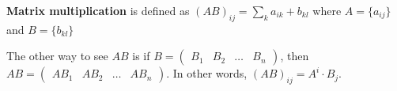 \begin{definition}
	\textbf{Matrix multiplication} is defined as \( (AB)_{ij} = \sum_{k} a_{ik} + b_{kl}\) where \( A=\{a_{ij}\}   \) and \( B = \{b_{kl}\}   \)
\end{definition}

The other way to see \( AB \) is if \( B=\begin{pmatrix}
	B_{1} & B_{2} & \ldots & B_n
\end{pmatrix} \), then \(	AB=\begin{pmatrix}
		AB_{1}&AB_{2}&\ldots &AB_n
	\end{pmatrix} \). In other words, \((AB)_{ij} = A^i \cdot B_j \).

